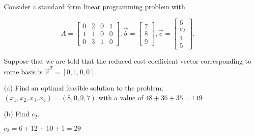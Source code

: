 \documentclass[12pt]{extarticle}
\theoremstyle{definition}
\begin{document}
\begin{problem} Consider a standard form linear programming problem with 

	\[A=\begin{bmatrix}
	0&2&0&1\\1&1&0&0\\0&3&1&0
	\end{bmatrix},\vec{b}=\begin{bmatrix}
	7\\8\\9
	\end{bmatrix},\vec{c}=\begin{bmatrix}
	6\\c_2\\4\\5
	\end{bmatrix}.\]

	Suppose that we are told that the reduced cost coefficient vector corresponding to some basis is $\vec{r}^T=[0,1,0,0]$.\\

	\begin{description}
		\item{(a)} Find an optimal feasible solution to the problem;\\

		$(x_1,x_2,x_3,x_4) = (8, 0, 9, 7)$ with a value of $48+36+35 = 119$

		\item{(b)} Find $c_2$.

		$c_2 = 6 + 12 + 10 + 1 = 29$

	\end{description}

\end{problem}
\end{document}
